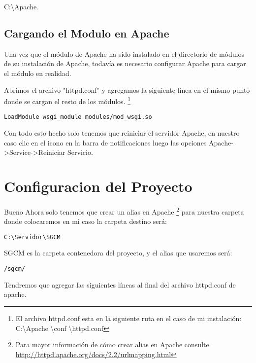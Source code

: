 C:\textbackslash Apache.

\subsection{Cargando el Modulo en Apache}

Una vez que el módulo de Apache ha sido instalado en el directorio de módulos de su instalación de Apache, todavía es necesario configurar Apache para cargar el módulo en realidad.

Abrimos el archivo "httpd.conf" y agregamos la siguiente línea en el mismo punto donde se cargan el resto de los módulos. \footnote {El archivo httpd.conf esta en la siguiente ruta en el caso de mi instalación: C:\textbackslash Apache \textbackslash conf \textbackslash httpd.conf}

\begin{lstlisting}[style=consola]
    LoadModule wsgi_module modules/mod_wsgi.so
\end{lstlisting}
\vspace{0.1cm}

Con todo esto hecho solo tenemos que reiniciar el servidor Apache, en nuestro  caso clic en el icono en la barra de notificaciones luego las opciones  Apache->Service->Reiniciar Servicio. 

\section{Configuracion del Proyecto}

Bueno Ahora solo tenemos que crear un alias en Apache \footnote{Para mayor información de cómo crear alias en Apache consulte \url{http://httpd.apache.org/docs/2.2/urlmapping.html}} para nuestra carpeta donde colocaremos en mi caso la carpeta destino será:

\begin{lstlisting}[style=consola]
	C:\Servidor\SGCM
\end{lstlisting}
\vspace{0.1cm}

SGCM es la carpeta contenedora del proyecto, y el alias que usaremos será:

\begin{lstlisting}[style=consola]
	/sgcm/ 
\end{lstlisting}
\vspace{0.1cm}

Tendremos que agregar las siguientes líneas al final del archivo httpd.conf de apache.

